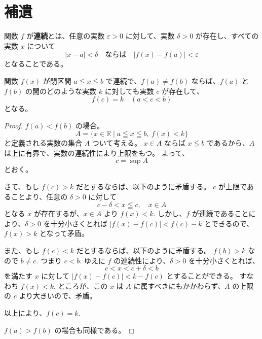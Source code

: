 \chapter{補遺}

\begin{dfn*}[関数が連続]
  関数 \(f\) が\textbf{連続}とは、任意の実数 \(\varepsilon>0\) に対して、実数 \(\delta>0\) が存在し、すべての実数 \(x\) について
  \[|x-a|<\delta \quad \text{ならば} \quad |f(x)-f(a)|<\varepsilon\]
  となることである。
\end{dfn*}

\begin{thm*}[中間値の定理]
  関数 \(f(x)\) が閉区間 \(a\leqq x\leqq b\) で連続で、\(f(a)\neq f(b)\) ならば、\(f(a)\) と \(f(b)\) の間のどのような実数 \(k\) に対しても実数 \(c\) が存在して、
  \[f(c)=k \quad (a<c<b)\]
  となる。
\end{thm*}

\begin{proof}
  \(f(a)<f(b)\) の場合。
  \[A=\{x\in\mathbb{R}\mid a\leqq x\leqq b,\:f(x)<k\}\]
  と定義される実数の集合 \(A\) ついて考える。
  \(x\in A\) ならば \(x\leqq b\) であるから、\(A\) は上に有界で、実数の連続性により上限をもつ。
  よって、
  \[c=\sup{A}\]
  とおく。

  さて、もし \(f(c)>k\) だとするならば、以下のように矛盾する。
  \(c\) が上限であることより、任意の \(\delta>0\) に対して
  \[c-\delta<x\leqq c,\quad x\in A\]
  となる \(x\) が存在するが、\(x\in A\) より \(f(x)<k.\)
  しかし、\(f\) が連続であることにより、\(\delta>0\) を十分小さくとれば \(|f(x)-f(c)|<f(c)-k\) とできるので、\(f(x)>k\) となって矛盾。

  また、もし \(f(c)<k\) だとするならば、以下のように矛盾する。
  \(f(b)>k\) なので \(b\neq c.\)
  つまり \(c<b.\)
  ゆえに \(f\) の連続性により、\(\delta>0\) を十分小さくとれば、
  \[c<x<c+\delta<b\]
  を満たす \(x\) に対して \(|f(x)-f(c)|<k-f(c)\) とすることができる。
  すなわち \(f(x)<k.\)
  ところが、この \(x\) は \(A\) に属すべきにもかかわらず、\(A\) の上限の \(c\) より大きいので、矛盾。

  以上により、\(f(c)=k.\)

  \(f(a)>f(b)\) の場合も同様である。
\end{proof}
